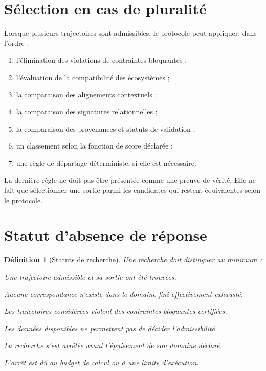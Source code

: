 \documentclass[11pt,a4paper,oneside]{book}
\newtheorem{definition}{Définition}[chapter]
\theoremstyle{remark}
\begin{document}
\section{Sélection en cas de pluralité}

Lorsque plusieurs trajectoires sont admissibles, le protocole peut
appliquer, dans l'ordre :

\begin{enumerate}
  \item l'élimination des violations de contraintes bloquantes ;
  \item l'évaluation de la compatibilité des écosystèmes ;
  \item la comparaison des alignements contextuels ;
  \item la comparaison des signatures relationnelles ;
  \item la comparaison des provenances et statuts de validation ;
  \item un classement selon la fonction de score déclarée ;
  \item une règle de départage déterministe, si elle est nécessaire.
\end{enumerate}

La dernière règle ne doit pas être présentée comme une preuve
de vérité. Elle ne fait que sélectionner une sortie parmi les
candidates qui restent équivalentes selon le protocole.

\section{Statut d'absence de réponse}

\begin{definition}[Statuts de recherche]
Une recherche doit distinguer au minimum :

\begin{description}[leftmargin=3.2cm,style=nextline]
  \item[FOUND] Une trajectoire admissible et sa sortie ont été
        trouvées.
  \item[NO\_MATCH] Aucune correspondance n'existe dans le domaine
        fini effectivement exhausté.
  \item[INCOMPATIBLE] Les trajectoires considérées violent des
        contraintes bloquantes certifiées.
  \item[UNKNOWN] Les données disponibles ne permettent pas de
        décider l'admissibilité.
  \item[INCOMPLETE] La recherche s'est arrêtée avant l'épuisement
        de son domaine déclaré.
  \item[RESOURCE\_STOP] L'arrêt est dû au budget de calcul ou
        à une limite d'exécution.
\end{description}
\end{definition}
\end{document}
